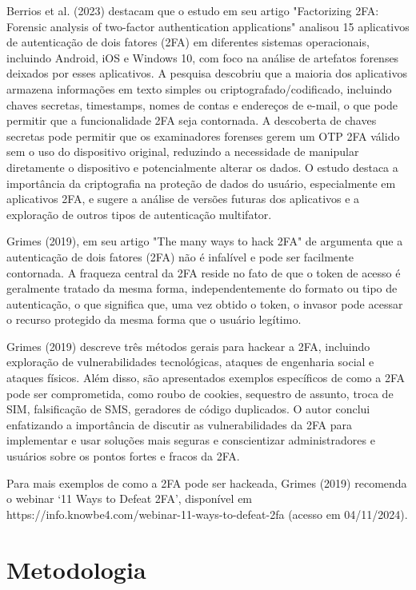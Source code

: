 \documentclass[12pt]{article}
\begin{document}
Berrios et al. (2023) destacam que o estudo em seu artigo "Factorizing 2FA:
Forensic analysis of two-factor authentication applications" analisou 15
aplicativos de autenticação de dois fatores (2FA) em diferentes sistemas
operacionais, incluindo Android, iOS e Windows 10, com foco na análise de
artefatos forenses deixados por esses aplicativos.
A pesquisa descobriu que a maioria dos aplicativos armazena informações em
texto simples ou criptografado/codificado, incluindo chaves secretas,
timestamps, nomes de contas e endereços de e-mail, o que pode permitir que
a funcionalidade 2FA seja contornada.
A descoberta de chaves secretas pode permitir que os examinadores forenses
gerem um OTP 2FA válido sem o uso do dispositivo original, reduzindo a
necessidade de manipular diretamente o dispositivo e potencialmente alterar
os dados.
O estudo destaca a importância da criptografia na proteção de dados do
usuário, especialmente em aplicativos 2FA, e sugere a análise de versões
futuras dos aplicativos e a exploração de outros tipos de autenticação
multifator.

Grimes (2019), em seu artigo "The many ways to hack 2FA" de argumenta que a
autenticação de dois fatores (2FA) não é infalível e pode ser facilmente
contornada.
A fraqueza central da 2FA reside no fato de que o token de acesso é
geralmente tratado da mesma forma, independentemente do formato ou tipo de
autenticação, o que significa que, uma vez obtido o token, o invasor pode
acessar o recurso protegido da mesma forma que o usuário legítimo.


Grimes (2019) descreve três métodos gerais para hackear a 2FA, incluindo
exploração de vulnerabilidades tecnológicas, ataques de engenharia social
e ataques físicos.
Além disso, são apresentados exemplos específicos de como a 2FA pode ser
comprometida, como roubo de cookies, sequestro de assunto, troca de SIM,
falsificação de SMS, geradores de código duplicados.
O autor conclui enfatizando a importância de discutir
as vulnerabilidades da 2FA para implementar e usar soluções mais seguras
e conscientizar administradores e usuários sobre os pontos fortes e fracos
da 2FA.

Para mais exemplos de como a 2FA pode ser hackeada, Grimes (2019) recomenda
o webinar ‘11 Ways to Defeat 2FA’, disponível em
https://info.knowbe4.com/webinar-11-ways-to-defeat-2fa (acesso em 04/11/2024).

\section{Metodologia}
\end{document}
